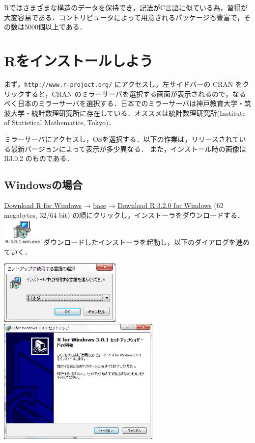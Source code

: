 \documentclass[a4paper,10pt,fleqn]{jarticle}
\begin{document}
Rではさまざまな構造のデータを保持でき，記法がC言語に似ている為，習得が大変容易である．コントリビュータによって用意されるパッケージも豊富で，その数は5000個以上である．

\section{Rをインストールしよう}
まず，{\tt http://www.r-project.org/} にアクセスし，左サイドバーの CRAN をクリックすると，CRAN のミラーサーバを選択する画面が表示されるので，なるべく日本のミラーサーバを選択する．日本でのミラーサーバは神戸教育大学・筑波大学・統計数理研究所に存在している．オススメは統計数理研究所(Institute of Statistical Mathematics, Tokyo)．

ミラーサーバにアクセスし，OSを選択する．以下の作業は，リリースされている最新バージョンによって表示が多少異なる．
また，インストール時の画像は R3.0.2 のものである．

\subsection{Windowsの場合}
\underline{Download R for Windows} → \underline{base} → \underline{Download R 3.2.0 for Windows} (62 megabytes, 32/64 bit) の順にクリックし，インストーラをダウンロードする．
\includegraphics[width=2cm]{img/windows/win001.eps} ダウンロードしたインストーラを起動し，以下のダイアログを進めていく．

\includegraphics[width=6cm]{img/windows/win002.eps}\hspace{0.8em} \includegraphics[width=8cm]{img/windows/win003.eps}\\
\end{document}
